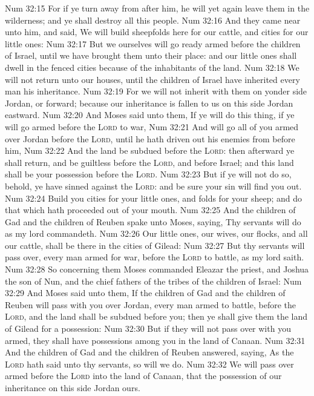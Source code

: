 \vs Num 32:15 For if ye turn away from after him, he will yet again leave them in the wilderness; and ye shall destroy all this people.
\vs Num 32:16 And they came near unto him, and said, We will build sheepfolds here for our cattle, and cities for our little ones:
\vs Num 32:17 But we ourselves will go ready armed before the children of Israel, until we have brought them unto their place: and our little ones shall dwell in the fenced cities because of the inhabitants of the land.
\vs Num 32:18 We will not return unto our houses, until the children of Israel have inherited every man his inheritance.
\vs Num 32:19 For we will not inherit with them on yonder side Jordan, or forward; because our inheritance is fallen to us on this side Jordan eastward.
\vs Num 32:20 And Moses said unto them, If ye will do this thing, if ye will go armed before the \textsc{Lord} to war,
\vs Num 32:21 And will go all of you armed over Jordan before the \textsc{Lord}, until he hath driven out his enemies from before him,
\vs Num 32:22 And the land be subdued before the \textsc{Lord}: then afterward ye shall return, and be guiltless before the \textsc{Lord}, and before Israel; and this land shall be your possession before the \textsc{Lord}.
\vs Num 32:23 But if ye will not do so, behold, ye have sinned against the \textsc{Lord}: and be sure your sin will find you out.
\vs Num 32:24 Build you cities for your little ones, and folds for your sheep; and do that which hath proceeded out of your mouth.
\vs Num 32:25 And the children of Gad and the children of Reuben spake unto Moses, saying, Thy servants will do as my lord commandeth.
\vs Num 32:26 Our little ones, our wives, our flocks, and all our cattle, shall be there in the cities of Gilead:
\vs Num 32:27 But thy servants will pass over, every man armed for war, before the \textsc{Lord} to battle, as my lord saith.
\vs Num 32:28 So concerning them Moses commanded Eleazar the priest, and Joshua the son of Nun, and the chief fathers of the tribes of the children of Israel:
\vs Num 32:29 And Moses said unto them, If the children of Gad and the children of Reuben will pass with you over Jordan, every man armed to battle, before the \textsc{Lord}, and the land shall be subdued before you; then ye shall give them the land of Gilead for a possession:
\vs Num 32:30 But if they will not pass over with you armed, they shall have possessions among you in the land of Canaan.
\vs Num 32:31 And the children of Gad and the children of Reuben answered, saying, As the \textsc{Lord} hath said unto thy servants, so will we do.
\vs Num 32:32 We will pass over armed before the \textsc{Lord} into the land of Canaan, that the possession of our inheritance on this side Jordan  ours.
